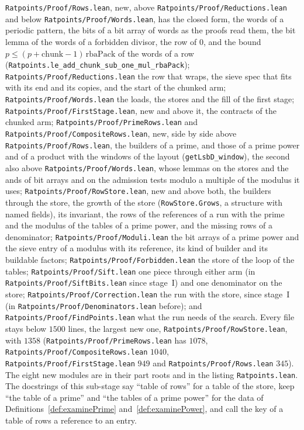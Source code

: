 \verb|Ratpoints/Proof/Rows.lean|, new, above \verb|Ratpoints/Proof/Reductions.lean| and below
\verb|Ratpoints/Proof/Words.lean|, has the closed form, the words of a periodic pattern, the bits of
a bit array of words as the proofs read them, the bit lemma of the words of a forbidden divisor, the
row of $0$, and the bound $p \le (p + \mathrm{chunk} - 1)\,\mathrm{rbaPack}$ of the words of a row
(\verb|Ratpoints.le_add_chunk_sub_one_mul_rbaPack|); \verb|Ratpoints/Proof/Reductions.lean| the row
that wraps, the sieve spec that fits with its end and its copies, and the start of the chunked arm;
\verb|Ratpoints/Proof/Words.lean| the loads, the stores and the fill of the first stage;
\verb|Ratpoints/Proof/FirstStage.lean|, new and above it, the contracts of the chunked arm;
\verb|Ratpoints/Proof/PrimeRows.lean| and \verb|Ratpoints/Proof/CompositeRows.lean|, new, side by
side above \verb|Ratpoints/Proof/Rows.lean|, the builders of a prime, and those of a prime power and
of a product with the windows of the layout (\verb|getLsbD_window|), the second also above
\verb|Ratpoints/Proof/Words.lean|, whose lemmas on the stores and the ands of bit arrays and on the
admission tests modulo a multiple of the modulus it uses; \verb|Ratpoints/Proof/RowStore.lean|, new
and above both, the builders through the store, the growth of the store (\verb|RowStore.Grows|, a
structure with named fields), its invariant, the rows of the references of a run with the prime and
the modulus of the tables of a prime power, and the missing rows of a denominator;
\verb|Ratpoints/Proof/Moduli.lean| the bit arrays of a prime power and the sieve entry of a modulus
with its reference, its kind of builder and its buildable factors;
\verb|Ratpoints/Proof/Forbidden.lean| the store of the loop of the tables;
\verb|Ratpoints/Proof/Sift.lean| one piece through either arm (in
\verb|Ratpoints/Proof/SiftBits.lean| since stage~I) and one denominator on the store;
\verb|Ratpoints/Proof/Correction.lean| the run with the store, since stage~I (in
\verb|Ratpoints/Proof/Denominators.lean| before); and \verb|Ratpoints/Proof/FindPoints.lean| what
the run needs of the search. Every file stays below $1500$ lines, the largest new one,
\verb|Ratpoints/Proof/RowStore.lean|, with $1358$ (\verb|Ratpoints/Proof/PrimeRows.lean| has $1078$,
\verb|Ratpoints/Proof/CompositeRows.lean| $1040$, \verb|Ratpoints/Proof/FirstStage.lean| $949$ and
\verb|Ratpoints/Proof/Rows.lean| $345$). The eight new modules are in their part roots and in the
listing \verb|Ratpoints.lean|. The docstrings of this sub-stage say ``table of rows'' for a table of
the store, keep ``the table of a prime'' and ``the tables of a prime power'' for the data of
Definitions~\ref{def:examinePrime} and~\ref{def:examinePower}, and call the key of a table of rows a
reference to an entry.

